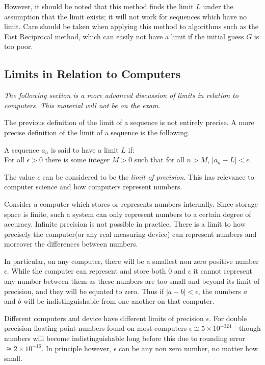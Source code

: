 However, it should be noted that this method finds the limit $L$ under the assumption that the limit exists; it will not work for sequences which have no limit. Care should be taken when applying this method to algorithms such as the Fast Reciprocal method, which can easily not have a limit if the initial guess $G$ is too poor.


\pagebreak
\subsection*{Limits in Relation to Computers}
\emph{The following section is a more advanced discussion of limits in relation to computers. This material will not be on the exam.}

The previous definition of the limit of a sequence is not entirely precise. A more precise definition of the limit of a sequence is the following.
\begin{framed}
A sequence $a_n$ is said to have a limit $L$ if:\\
For all $\epsilon > 0$ there is some integer $M>0$ such that for all $n>M$, $|a_n-L|< \epsilon$.
\end{framed}
The value $\epsilon$ can be considered to be the \emph{limit of precision}. This has relevance to computer science and how computers represent numbers.

Consider a computer which stores or represents numbers internally. Since storage space is finite, such a system can only represent numbers to a certain degree of accuracy. Infinite precision is not possible in practice. There is a limit to how precisely the computer(or any real measuring device) can represent numbers and moreover the differences between numbers.

In particular, on any computer, there will be a smallest non zero positive number $\epsilon$. While the computer can represent and store both $0$ and $\epsilon$ it cannot represent any number between them as these numbers are too small and beyond its limit of precision, and they will be equated to zero. Thus if $|a-b|<\epsilon$, the numbers $a$ and $b$ will be indistinguishable from one another on that computer.

Different computers and device have different limits of precision $\epsilon$. For double precision floating point numbers found on most computers $\epsilon \cong 5 \times 10^{-324}$—though numbers will become indistinguishable long before this due to rounding error $\cong  2 \times 10^{-16}$. In principle however, $\epsilon$ can be any non zero number, no matter how small.

